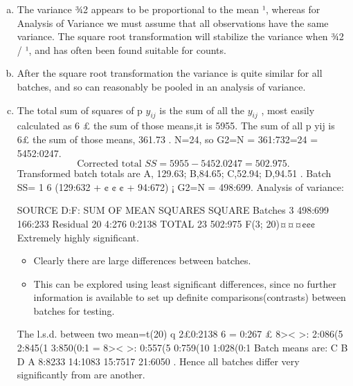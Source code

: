 \documentclass[a4paper,12pt]{article}
\begin{document}
\begin{enumerate}[(a)]
\item The variance ¾2 appears to be proportional to the mean ¹, whereas for Analysis of Variance
we must assume that all observations have the same variance. The square root transformation will
stabilize the variance when ¾2 / ¹, and has often been found suitable for counts.
\item After the square root transformation the variance is quite similar for all batches, and so can
reasonably be pooled in an analysis of variance.
\item The total sum of squares of p
$y_{ij}$ is the sum of all the $y_{ij}$ , most easily calculated as 6 £ the
sum of those means,it is 5955.
The sum of all p
yij is 6£ the sum of those means, 361.73 .
N=24, so G2=N = 361:732=24 = 5452:0247.
\[\mbox{Corrected total }SS=5955-5452.0247=502.975 .\]
Transformed batch totals are A, 129.63; B,84.65; C,52.94; D,94.51 .
Batch SS= 1
6 (129:632 + ¢ ¢ ¢ + 94:672) ¡ G2=N = 498:699.
Analysis of variance:

SOURCE D:F: SUM OF MEAN
SQUARES SQUARE
Batches 3 498:699 166:233
Residual 20 4:276 0:2138
TOTAL 23 502:975
F(3; 20)¤¤¤¢¢¢ Extremely highly significant.
\begin{itemize}
    \item Clearly there are large differences between batches. 
    \item This can be explored using least significant
differences, since no further information is available to set up definite comparisons(contrasts) between
batches for testing.
\end{itemize}

The l.s.d. between two mean=t(20)
q
2£0:2138
6 = 0:267 £
8><
>:
2:086(5%
2:845(1%
3:850(0:1%
=
8><
>:
0:557(5%
0:759(10%
1:028(0:1%
Batch means are: C B D A
8:8233 14:1083 15:7517 21:6050
.
Hence all batches differ very significantly from are another.
\end{enumerate}
\end{document}
